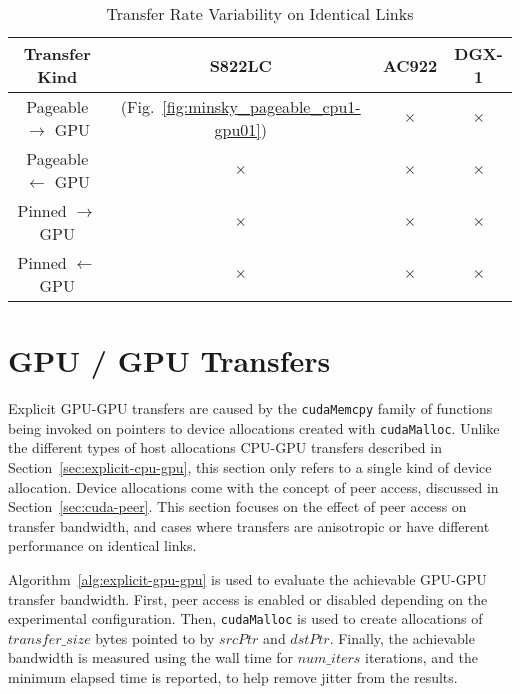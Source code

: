 \begin{table}[ht]
	\centering
	\caption[Transfer Rate Variability on Identical Links]{Transfer Rate Variability on Identical Links}
	\label{tab:explicit-identical}
	\begin{tabular}{cccc}
		\hline
		\textbf{Transfer Kind}     & \textbf{S822LC}                                        & \textbf{AC922} & \textbf{DGX-1} \\ \hline 
		Pageable $\rightarrow$ GPU & \checkmark (Fig.~\ref{fig:minsky_pageable_cpu1-gpu01}) & $\times$       & $\times$       \\ \hline
		Pageable $\leftarrow$ GPU  & $\times$                                               & $\times$       & $\times$       \\ \hline
		Pinned $\rightarrow$ GPU   & $\times$                                               & $\times$       & $\times$       \\ \hline
		Pinned $\leftarrow$ GPU    & $\times$                                               & $\times$       & $\times$       \\ \hline
	\end{tabular}
\end{table}

\section{GPU / GPU Transfers}
\label{sec:explicit-gpu-gpu}

Explicit GPU-GPU transfers are caused by the \texttt{cudaMemcpy} family of functions being invoked on pointers to device allocations created with \texttt{cudaMalloc}.
Unlike the different types of host allocations CPU-GPU transfers described in Section~\ref{sec:explicit-cpu-gpu}, this section only refers to a single kind of device allocation.
Device allocations come with the concept of peer access, discussed in Section~\ref{sec:cuda-peer}.
This section focuses on the effect of peer access on transfer bandwidth, and cases where transfers are anisotropic or have different performance on identical links.

Algorithm~\ref{alg:explicit-gpu-gpu} is used to evaluate the achievable GPU-GPU transfer bandwidth.
First, peer access is enabled or disabled depending on the experimental configuration.
Then, \texttt{cudaMalloc} is used to create allocations of $transfer\_size$ bytes pointed to by $srcPtr$ and $dstPtr$.
Finally, the achievable bandwidth is measured using the wall time for $num\_iters$ iterations, and the minimum elapsed time is reported, to help remove jitter from the results.

